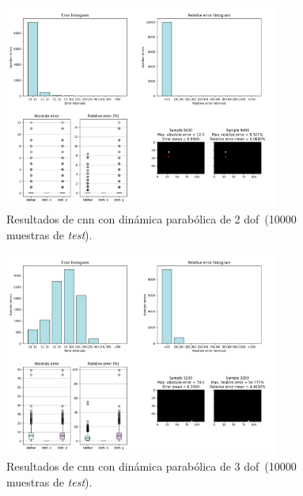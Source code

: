 \begin{figure}[H]
		\begin{center}
			\includegraphics[width=0.8\textwidth]{ figures/test_raw/NOREC/parabolic_var_100000.png}
			\caption{Resultados de \acrshort{cnn} con dinámica parabólica de 2 \acrshort{dof}~(10000 muestras de \textit{test}).}
			\label{fig.raw_norec_par_var_100000}
		\end{center}
\end{figure}
\vspace{-30pt}
\begin{figure}[H]
		\begin{center}
			\includegraphics[width=0.8\textwidth]{ figures/test_raw/NOREC/parabolic_var1_100000.png}
			\caption{Resultados de \acrshort{cnn} con dinámica parabólica de 3 \acrshort{dof}~(10000 muestras de \textit{test}).}
			\label{fig.raw_norec_par_var1_100000}
		\end{center}
\end{figure}
\vspace{-10pt}

